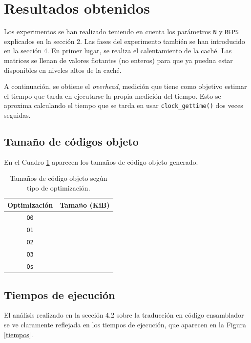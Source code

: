 \documentclass[11pt,a4paper,twoside]{article}
\theoremstyle{definition}
\begin{document}
	
	\section{Resultados obtenidos}
	
	Los experimentos se han realizado teniendo en cuenta los parámetros \texttt{N} y \texttt{REPS} explicados en la sección 2. Las fases del experimento también se han introducido en la sección 4. En primer lugar, se realiza el calentamiento de la caché. Las matrices se llenan de valores flotantes (no enteros) para que ya puedna estar disponibles en niveles altos de la caché. 
	
	A continuación, se obtiene el \textit{overhead}, medición que tiene como objetivo estimar el tiempo que tarda en ejecutarse la propia medición del tiempo. Esto se aproxima calculando el tiempo que se tarda en usar \texttt{clock\_gettime()} dos veces seguidas.
	
	\subsection{Tamaño de códigos objeto}
	
	En el Cuadro \ref{tam} aparecen los tamaños de código objeto generado.
	
	\begin{table} [H] \centering
		\begin{tabular} {| c | c |}
			\hline
			\textbf{Optimización} & \textbf{Tamaño (KiB)} \\
			\hline
			\texttt{O0} & \\
			\hline
			\texttt{O1} & \\
			\hline
			\texttt{O2} & \\
			\hline
			\texttt{O3} & \\
			\hline
			\texttt{Os} & \\
			\hline
		\end{tabular}
		\caption{Tamaños de código objeto según tipo de optimización.}
		\label{tam}
	\end{table}
	
	\subsection{Tiempos de ejecución}
	
	El análisis realizado en la sección 4.2 sobre la traducción en código ensamblador se ve claramente reflejada en los tiempos de ejecución, que aparecen en la Figura \ref{tiempos}.
	
\end{document}
